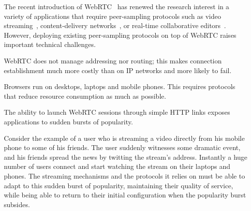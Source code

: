 The recent introduction of WebRTC~\cite{webrtc} has renewed the
research interest in a variety of applications that require
peer-sampling protocols such as video streaming~\cite{hivejs,smoothcache2},
content-delivery networks~\cite{Zhang:2013:MBC:2465351.2465379}, or
real-time collaborative editors~\cite{nedelec2016crate}. However,
deploying existing peer-sampling protocols on top of WebRTC raises
important technical challenges.
\begin{inparaenum}[(1)]
\item WebRTC does not manage addressing nor routing; this makes
  connection establishment much more costly than on IP networks and
  more likely to fail. 
\item Browsers run on desktops, laptops and mobile phones. This
  requires protocols that reduce resource consumption as much as
  possible.
\item The ability to launch WebRTC sessions through simple HTTP links
  exposes applications to sudden bursts of popularity.  %
\end{inparaenum}
Consider the example of a user who is streaming a video directly from
his mobile phone to some of his friends. The user suddenly witnesses
some dramatic event, and his friends spread the news by twitting the
stream's address. Instantly a huge number of users connect and start
watching the stream on their laptops and phones. The streaming
mechanisms and the protocols it relies on must be able to adapt to
this sudden burst of popularity, maintaining their quality of service,
while being able to return to their initial configuration when the
popularity burst subsides. 



